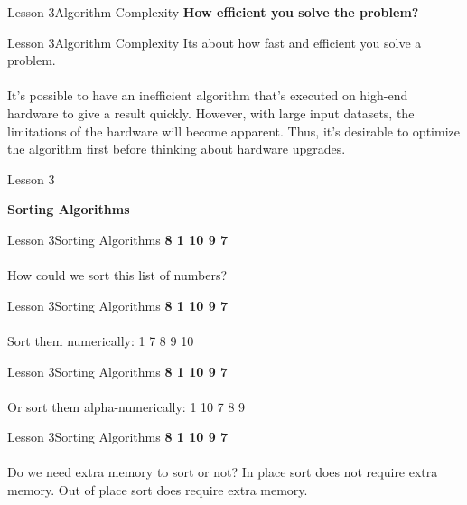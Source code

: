 \documentclass[aspectratio=1610]{beamer}
\begin{document}
\begin{frame}{Lesson 3}{Algorithm Complexity}
\huge
\textbf{How efficient you solve the problem?}
\end{frame}


\begin{frame}{Lesson 3}{Algorithm Complexity}
\LARGE
Its about how fast and efficient you solve a problem.\\~\\
\alert{It's possible to have an inefficient algorithm that's executed on high-end
hardware to give a result quickly. However, with large input datasets, the
limitations of the hardware will become apparent. Thus, it's desirable to 
optimize the algorithm first before thinking about hardware upgrades.}
\end{frame}





\begin{frame}{Lesson 3}{}
\begin{center}
\Huge \textbf{Sorting Algorithms}
\end{center}
\end{frame}





\begin{frame}{Lesson 3}{Sorting Algorithms}
\LARGE
\textbf{8 1 10 9 7}\\~\\
How could we sort this list of numbers?
\end{frame}


\begin{frame}{Lesson 3}{Sorting Algorithms}
\LARGE
\textbf{8 1 10 9 7}\\~\\
Sort them numerically: 1 7 8 9 10
\end{frame}


\begin{frame}{Lesson 3}{Sorting Algorithms}
\LARGE
\textbf{8 1 10 9 7}\\~\\
Or sort them alpha-numerically: 1 10 7 8 9
\end{frame}



\begin{frame}{Lesson 3}{Sorting Algorithms}
\LARGE
\textbf{8 1 10 9 7}\\~\\
Do we need extra memory to sort or not? In place sort does not 
require extra memory. Out of place sort does require extra memory.
\end{frame}
\end{document}
